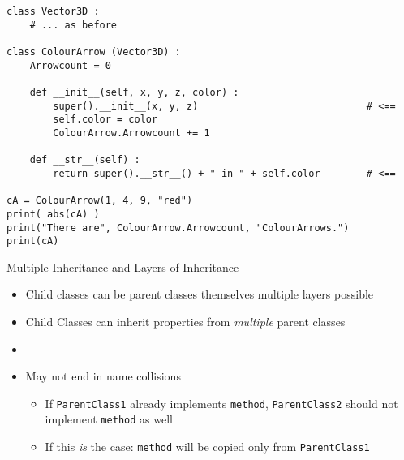 \begin{frame}[fragile]
%
\begin{codebox}
\begin{verbatim}
class Vector3D :
    # ... as before

class ColourArrow (Vector3D) :
    Arrowcount = 0
    
    def __init__(self, x, y, z, color) :
        super().__init__(x, y, z)                             # <==
        self.color = color
        ColourArrow.Arrowcount += 1
    
    def __str__(self) :
        return super().__str__() + " in " + self.color        # <==

cA = ColourArrow(1, 4, 9, "red")
print( abs(cA) )
print("There are", ColourArrow.Arrowcount, "ColourArrows.")
print(cA)
\end{verbatim}
\end{codebox}
%
\end{frame}


\begin{frame}[fragile]{Multiple Inheritance and Layers of Inheritance}
%
\begin{itemize}
\item Child classes can be parent classes themselves \Thus multiple layers possible
\item Child Classes can inherit properties from \emph{multiple} parent classes
\item {}
\item May not end in name collisions
	\begin{itemize}
	\item[\Thus] If \texttt{ParentClass1} already implements \texttt{method}, \texttt{ParentClass2} should not implement \texttt{method} as well
	\item[\Thus] If this \emph{is} the case: \texttt{method} will be copied only from \texttt{ParentClass1}
	\end{itemize}
\end{itemize}
%
\end{frame}


